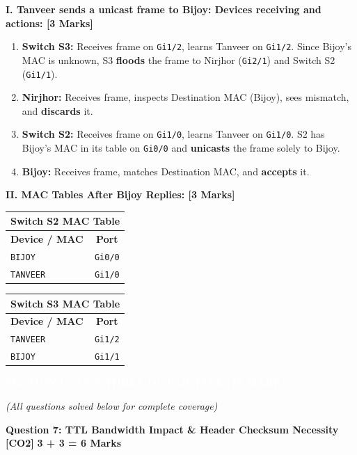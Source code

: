 \documentclass[11pt,a4paper]{article}
\newcommand{\questionheader}[3]{
    \vspace{0.35cm}
    \noindent\colorbox{qboxbg}{
        \parbox{\dimexpr\textwidth-2\fboxsep\relax}{
            \textbf{\textcolor{primary}{\large #1}} \hfill \textbf{\textcolor{accent}{[#2]}} \hfill \textbf{\textcolor{secondary}{#3 Marks}}
        }
    }
    \vspace{0.15cm}
}
\newcommand{\sectionbanner}[1]{
    \vspace{0.5cm}
    \noindent\colorbox{primary}{
        \parbox{\dimexpr\textwidth-2\fboxsep\relax}{
            \centering \textbf{\textcolor{white}{\Large #1}}
        }
    }
    \vspace{0.25cm}
}
\begin{document}
\textbf{I. Tanveer sends a unicast frame to Bijoy: Devices receiving and actions: [3 Marks]}
\begin{enumerate}
    \item \textbf{Switch S3:} Receives frame on \texttt{Gi1/2}, learns Tanveer on \texttt{Gi1/2}. Since Bijoy's MAC is unknown, S3 \textbf{floods} the frame to Nirjhor (\texttt{Gi2/1}) and Switch S2 (\texttt{Gi1/1}).
    \item \textbf{Nirjhor:} Receives frame, inspects Destination MAC (Bijoy), sees mismatch, and \textbf{discards} it.
    \item \textbf{Switch S2:} Receives frame on \texttt{Gi1/0}, learns Tanveer on \texttt{Gi1/0}. S2 has Bijoy's MAC in its table on \texttt{Gi0/0} and \textbf{unicasts} the frame solely to Bijoy.
    \item \textbf{Bijoy:} Receives frame, matches Destination MAC, and \textbf{accepts} it.
\end{enumerate}

\textbf{II. MAC Tables After Bijoy Replies: [3 Marks]}

\begin{center}
\begin{tabular}{|l|c|}
\multicolumn{2}{c}{\textbf{Switch S2 MAC Table}} \\
\hline
\textbf{Device / MAC} & \textbf{Port} \\
\hline
\texttt{BIJOY} & \texttt{Gi0/0} \\
\texttt{TANVEER} & \texttt{Gi1/0} \\
\hline
\end{tabular}
\qquad
\begin{tabular}{|l|c|}
\multicolumn{2}{c}{\textbf{Switch S3 MAC Table}} \\
\hline
\textbf{Device / MAC} & \textbf{Port} \\
\hline
\texttt{TANVEER} & \texttt{Gi1/2} \\
\texttt{BIJOY} & \texttt{Gi1/1} \\
\hline
\end{tabular}
\end{center}

\newpage
\sectionbanner{SECTION C: ANY THREE OUT OF FIVE (18 MARKS)}
\textit{(All questions solved below for complete coverage)}

\questionheader{Question 7: TTL Bandwidth Impact \& Header Checksum Necessity}{CO2}{3 + 3 = 6}
\end{document}
